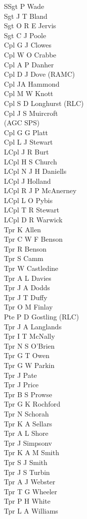 \begin{multicols}{3}
  \small
  \noindent
  SSgt P Wade \\
  Sgt J T Bland \\
  Sgt O R E Jervis \\
  Sgt C J Poole \\
  Cpl G J Clowes \\
  Cpl W O Crabbe \\
  Cpl A P Danher \\
  Cpl D J Dove (RAMC) \\
  Cpl JA Hammond \\
  Cpl M W Knott \\
  Cpl S D Longhurst (RLC) \\
  Cpl J S Muircroft \\ \indent (AGC SPS) \\
  Cpl G G Platt \\
  Cpl L J Stewart \\
  LCpl J R Burt \\
  LCpl H S Church \\
  LCpl N J H Daniells \\
  LCpl J Holland \\
  LCpl R J P McAnerney \\
  LCpl L O Pybis \\
  LCpl T R Stewart \\
  LCpl D R Warwick \\
  Tpr K Allen \\
  Tpr C W F Benson \\
  Tpr R Benson \\
  Tpr S Camm \\
  Tpr W Castledine \\
  Tpr A L Davies \\
  Tpr J A Dodds \\
  Tpr J T Duffy \\
  Tpr O M Finlay \\
  Pte P D Gostling (RLC) \\
  Tpr J A Langlands \\
  Tpr I T McNally \\
  Tpr N S O'Brien \\
  Tpr G T Owen \\
  Tpr G W Parkin \\
  Tpr J Pate \\
  Tpr J Price \\
  Tpr B S Prowse \\
  Tpr G K Rochford \\
  Tpr N Schorah \\
  Tpr K A Sellars \\
  Tpr A L Shore \\
  Tpr J Simpsonv \\
  Tpr K A M Smith \\
  Tpr S J Smith \\
  Tpr J S Turbin \\
  Tpr A J Webster \\
  Tpr T G Wheeler \\
  Tpr P H White \\
  Tpr L A Williams \\
\end{multicols}

\pagebreak
